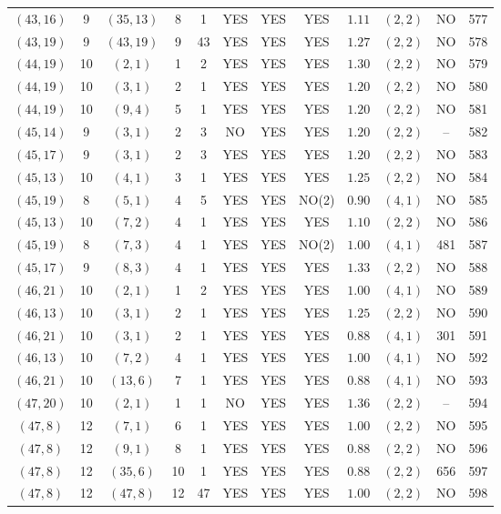 \begin{longtable}{|c|c|c|c|c|c|c|c|c|c|c|c|}
$(43,16)$ & 9 & $(35,13)$ & 8 & 1 & YES & YES & YES & $1.11$ & $(2,2)$ & NO & 577\\
$(43,19)$ & 9 & $(43,19)$ & 9 & 43 & YES & YES & YES & $1.27$ & $(2,2)$ & NO & 578\\
$(44,19)$ & 10 & $(2,1)$ & 1 & 2 & YES & YES & YES & $1.30$ & $(2,2)$ & NO & 579\\
$(44,19)$ & 10 & $(3,1)$ & 2 & 1 & YES & YES & YES & $1.20$ & $(2,2)$ & NO & 580\\
$(44,19)$ & 10 & $(9,4)$ & 5 & 1 & YES & YES & YES & $1.20$ & $(2,2)$ & NO & 581\\
$(45,14)$ & 9 & $(3,1)$ & 2 & 3 & NO & YES & YES & $1.20$ & $(2,2)$ & -- & 582\\
$(45,17)$ & 9 & $(3,1)$ & 2 & 3 & YES & YES & YES & $1.20$ & $(2,2)$ & NO & 583\\
$(45,13)$ & 10 & $(4,1)$ & 3 & 1 & YES & YES & YES & $1.25$ & $(2,2)$ & NO & 584\\
$(45,19)$ & 8 & $(5,1)$ & 4 & 5 & YES & YES & NO(2) & $0.90$ & $(4,1)$ & NO & 585\\
$(45,13)$ & 10 & $(7,2)$ & 4 & 1 & YES & YES & YES & $1.10$ & $(2,2)$ & NO & 586\\
$(45,19)$ & 8 & $(7,3)$ & 4 & 1 & YES & YES & NO(2) & $1.00$ & $(4,1)$ & 481 & 587\\
$(45,17)$ & 9 & $(8,3)$ & 4 & 1 & YES & YES & YES & $1.33$ & $(2,2)$ & NO & 588\\
$(46,21)$ & 10 & $(2,1)$ & 1 & 2 & YES & YES & YES & $1.00$ & $(4,1)$ & NO & 589\\
$(46,13)$ & 10 & $(3,1)$ & 2 & 1 & YES & YES & YES & $1.25$ & $(2,2)$ & NO & 590\\
$(46,21)$ & 10 & $(3,1)$ & 2 & 1 & YES & YES & YES & $0.88$ & $(4,1)$ & 301 & 591\\
$(46,13)$ & 10 & $(7,2)$ & 4 & 1 & YES & YES & YES & $1.00$ & $(4,1)$ & NO & 592\\
$(46,21)$ & 10 & $(13,6)$ & 7 & 1 & YES & YES & YES & $0.88$ & $(4,1)$ & NO & 593\\
$(47,20)$ & 10 & $(2,1)$ & 1 & 1 & NO & YES & YES & $1.36$ & $(2,2)$ & -- & 594\\
$(47,8)$ & 12 & $(7,1)$ & 6 & 1 & YES & YES & YES & $1.00$ & $(2,2)$ & NO & 595\\
$(47,8)$ & 12 & $(9,1)$ & 8 & 1 & YES & YES & YES & $0.88$ & $(2,2)$ & NO & 596\\
$(47,8)$ & 12 & $(35,6)$ & 10 & 1 & YES & YES & YES & $0.88$ & $(2,2)$ & 656 & 597\\
$(47,8)$ & 12 & $(47,8)$ & 12 & 47 & YES & YES & YES & $1.00$ & $(2,2)$ & NO & 598\\

\end{longtable}
